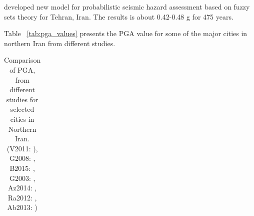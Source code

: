 \citet{Boostan2015} developed new model for probabilistic seismic hazard assessment based on fuzzy sets theory for Tehran, Iran. The results is about 0.42-0.48 g for 475 years. 

Table ~\ref{tab:pga_values} presents the PGA value for some of the major cities in northern Iran from different studies. 



\begin{table}[!ht]
\centering
\caption{Comparison of PGA, from different studies for selected cities in Northern Iran. (V2011:  \citet{Vafaie2011}), G2008: \citet{Ghodrati2008}, B2015: \citet{Boostan2015},  G2003:  \citet{Ghodrati2003},  Az2014: \citet{Abdollahzadeh2014a} , Ra2012: \citet{Rahgozar2012} , Ab2013: \citet{Abdi2013} ) }
\begin{tabular}{ | c | c | c | c | c | c | c | c | c | c | c |}


\hline


\end{tabular}
\end{table}

